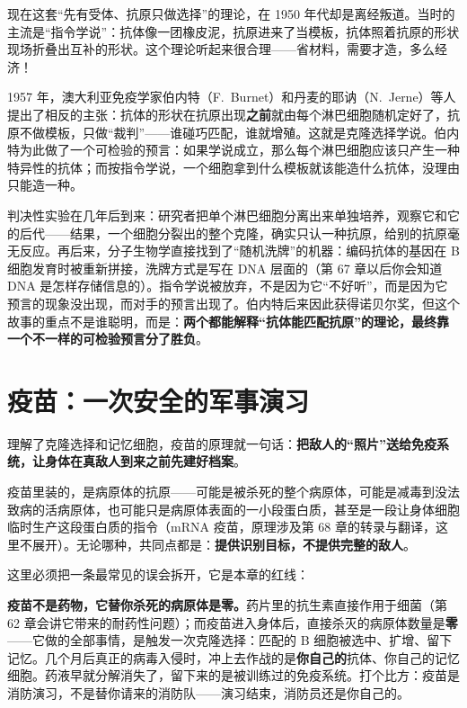\begin{zhengju}
现在这套“先有受体、抗原只做选择”的理论，在 1950 年代却是离经叛道。当时的主流是“指令学说”：抗体像一团橡皮泥，抗原进来了当模板，抗体照着抗原的形状现场折叠出互补的形状。这个理论听起来很合理——省材料，需要才造，多么经济！

1957 年，澳大利亚免疫学家伯内特（F.~Burnet）和丹麦的耶讷（N.~Jerne）等人提出了相反的主张：抗体的形状在抗原出现\textbf{之前}就由每个淋巴细胞随机定好了，抗原不做模板，只做“裁判”——谁碰巧匹配，谁就增殖。这就是克隆选择学说。伯内特为此做了一个可检验的预言：如果学说成立，那么每个淋巴细胞应该只产生一种特异性的抗体；而按指令学说，一个细胞拿到什么模板就该能造什么抗体，没理由只能造一种。

判决性实验在几年后到来：研究者把单个淋巴细胞分离出来单独培养，观察它和它的后代——结果，一个细胞分裂出的整个克隆，确实只认一种抗原，给别的抗原毫无反应。再后来，分子生物学直接找到了“随机洗牌”的机器：编码抗体的基因在 B 细胞发育时被重新拼接，洗牌方式是写在 DNA 层面的（第 67 章以后你会知道 DNA 是怎样存储信息的）。指令学说被放弃，不是因为它“不好听”，而是因为它预言的现象没出现，而对手的预言出现了。伯内特后来因此获得诺贝尔奖，但这个故事的重点不是谁聪明，而是：\textbf{两个都能解释“抗体能匹配抗原”的理论，最终靠一个不一样的可检验预言分了胜负}。
\end{zhengju}

\section{疫苗：一次安全的军事演习}

理解了克隆选择和记忆细胞，疫苗的原理就一句话：\textbf{把敌人的“照片”送给免疫系统，让身体在真敌人到来之前先建好档案}。

疫苗里装的，是病原体的抗原——可能是被杀死的整个病原体，可能是减毒到没法致病的活病原体，也可能只是病原体表面的一小段蛋白质，甚至是一段让身体细胞临时生产这段蛋白质的指令（mRNA 疫苗，原理涉及第 68 章的转录与翻译，这里不展开）。无论哪种，共同点都是：\textbf{提供识别目标，不提供完整的敌人}。

这里必须把一条最常见的误会拆开，它是本章的红线：

\textbf{疫苗不是药物，它替你杀死的病原体是零。}药片里的抗生素直接作用于细菌（第 62 章会讲它带来的耐药性问题）；而疫苗进入身体后，直接杀灭的病原体数量是\textbf{零}——它做的全部事情，是触发一次克隆选择：匹配的 B 细胞被选中、扩增、留下记忆。几个月后真正的病毒入侵时，冲上去作战的是\textbf{你自己的}抗体、你自己的记忆细胞。药液早就分解消失了，留下来的是被训练过的免疫系统。打个比方：疫苗是消防演习，不是替你请来的消防队——演习结束，消防员还是你自己的。

